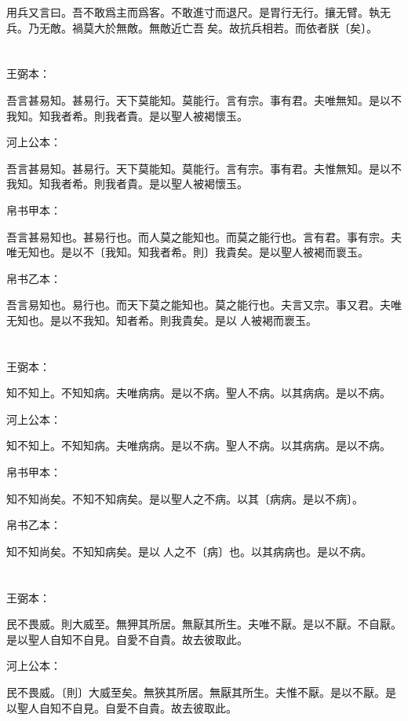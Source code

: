 \documentclass[a5paper]{ctexbook}
\begin{document}
    用兵又言曰。吾不敢爲主而爲客。不敢進寸而退尺。是胃行无行。攘无臂。執无兵。乃无敵。禍莫大於無敵。無敵近亡吾𤥯矣。故抗兵相若。而依者朕〔矣〕。

    \chapter{}
    王弼本：

    吾言甚易知。甚易行。天下莫能知。莫能行。言有宗。事有君。夫唯無知。是以不我知。知我者希。則我者貴。是以聖人被褐懷玉。

    河上公本：

    吾言甚易知。甚易行。天下莫能知。莫能行。言有宗。事有君。夫惟無知。是以不我知。知我者希。則我者貴。是以聖人被褐懷玉。

    帛书甲本：

    吾言甚易知也。甚易行也。而人莫之能知也。而莫之能行也。言有君。事有宗。夫唯无知也。是以不〔我知。知我者希。則〕我貴矣。是以聖人被褐而褱玉。

    帛书乙本：

    吾言易知也。易行也。而天下莫之能知也。莫之能行也。夫言又宗。事又君。夫唯无知也。是以不我知。知者希。則我貴矣。是以𦔻人被褐而褱玉。

    \chapter{}
    王弼本：

    知不知上。不知知病。夫唯病病。是以不病。聖人不病。以其病病。是以不病。

    河上公本：

    知不知上。不知知病。夫唯病病。是以不病。聖人不病。以其病病。是以不病。

    帛书甲本：

    知不知尚矣。不知不知病矣。是以聖人之不病。以其〔病病。是以不病〕。

    帛书乙本：

    知不知尚矣。不知知病矣。是以𦔻人之不〔病〕也。以其病病也。是以不病。

    \chapter{}
    王弼本：

    民不畏威。則大威至。無狎其所居。無厭其所生。夫唯不厭。是以不厭。不自厭。是以聖人自知不自見。自愛不自貴。故去彼取此。

    河上公本：

    民不畏威。〔則〕大威至矣。無狹其所居。無厭其所生。夫惟不厭。是以不厭。是以聖人自知不自見。自愛不自貴。故去彼取此。
\end{document}
